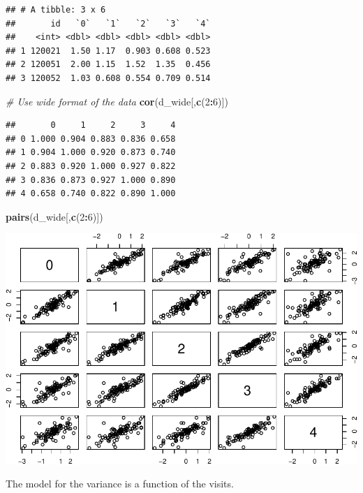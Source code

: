 \documentclass[
]{article}
\newenvironment{Shaded}{\begin{snugshade}}{\end{snugshade}}
\newcommand{\CommentTok}[1]{\textcolor[rgb]{0.56,0.35,0.01}{\textit{#1}}}
\newcommand{\DecValTok}[1]{\textcolor[rgb]{0.00,0.00,0.81}{#1}}
\newcommand{\FunctionTok}[1]{\textcolor[rgb]{0.13,0.29,0.53}{\textbf{#1}}}
\newcommand{\NormalTok}[1]{#1}
\newcommand{\SpecialCharTok}[1]{\textcolor[rgb]{0.81,0.36,0.00}{\textbf{#1}}}
\begin{document}
\begin{verbatim}
## # A tibble: 3 x 6
##       id   `0`   `1`   `2`   `3`   `4`
##    <int> <dbl> <dbl> <dbl> <dbl> <dbl>
## 1 120021  1.50 1.17  0.903 0.608 0.523
## 2 120051  2.00 1.15  1.52  1.35  0.456
## 3 120052  1.03 0.608 0.554 0.709 0.514
\end{verbatim}

\begin{Shaded}
\begin{Highlighting}[]
\CommentTok{\# Use wide format of the data}
\FunctionTok{cor}\NormalTok{(d\_wide[,}\FunctionTok{c}\NormalTok{(}\DecValTok{2}\SpecialCharTok{:}\DecValTok{6}\NormalTok{)])}
\end{Highlighting}
\end{Shaded}

\begin{verbatim}
##       0     1     2     3     4
## 0 1.000 0.904 0.883 0.836 0.658
## 1 0.904 1.000 0.920 0.873 0.740
## 2 0.883 0.920 1.000 0.927 0.822
## 3 0.836 0.873 0.927 1.000 0.890
## 4 0.658 0.740 0.822 0.890 1.000
\end{verbatim}

\begin{Shaded}
\begin{Highlighting}[]
\FunctionTok{pairs}\NormalTok{(d\_wide[,}\FunctionTok{c}\NormalTok{(}\DecValTok{2}\SpecialCharTok{:}\DecValTok{6}\NormalTok{)])}
\end{Highlighting}
\end{Shaded}

\includegraphics{ProblemSet3_ts_1677791812_files/figure-latex/unnamed-chunk-9-1.pdf}

The model for the variance is a function of the visits.
\end{document}
